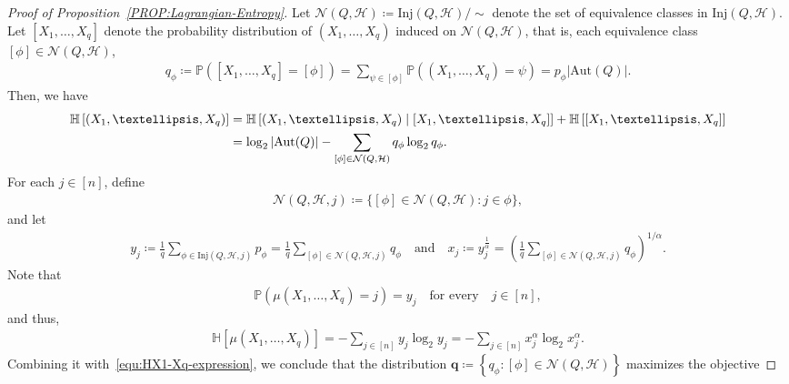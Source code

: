 \documentclass[10pt,a4paper]{amsart}
\begin{document}
\begin{proof}[Proof of Proposition~\ref{PROP:Lagrangian-Entropy}]
    Let $\mathcal{N}(Q,\mathcal{H}) \coloneqq \mathrm{Inj}(Q,\mathcal{H})/\sim$ denote the set of equivalence classes in $\mathrm{Inj}(Q,\mathcal{H})$. 
    Let $[X_1, \ldots, X_q]$ denote the probability distribution of $(X_1, \ldots, X_q)$ induced on $\mathcal{N}(Q,\mathcal{H})$, that is, each equivalence class $[\phi] \in \mathcal{N}(Q,\mathcal{H})$, 
    \begin{align}\label{equ:def-q-phi}
        q_{\phi}
        \coloneqq \mathbb{P}\left([X_1, \ldots, X_q] = [\phi] \right)
        = \sum_{\psi \in [\phi]} \mathbb{P}\left((X_1, \ldots, X_q) = \psi\right) 
        = p_{\phi} |\mathrm{Aut}(Q)|. 
    \end{align}
    Then, we have  
    \begin{align}\label{equ:HX1-Xq-expression}
        \mathbb{H}\left[ (X_1, \ldots, X_q) \right]
        & = \mathbb{H}\left[ (X_1, \ldots, X_q) \mid [X_1, \ldots, X_q] \right] + \mathbb{H}\left[ [X_1, \ldots, X_q] \right] \notag \\
        & = \log_{2} |\mathrm{Aut}(Q)| - \sum_{[\phi] \in \mathcal{N}(Q,\mathcal{H})} q_{\phi} \log_{2} q_{\phi}. 
    \end{align}
    For each $j \in [n]$, define  
    \begin{align*}
        \mathcal{N}(Q, \mathcal{H}, j)
        \coloneqq \big\{  [\phi] \in \mathcal{N}(Q, \mathcal{H}) \colon j \in \phi \big\}, 
    \end{align*}
    and let 
    \begin{align}\label{equ:def-yj}
        y_j 
        \coloneqq \frac{1}{q} \sum_{\phi \in \mathrm{Inj}(Q,\mathcal{H}, j)}p_{\phi}
        = \frac{1}{q} \sum_{[\phi] \in \mathcal{N}(Q, \mathcal{H}, j)} q_{\phi}
        \quad\text{and}\quad 
        x_{j}
        \coloneqq  y_j^{\frac{1}{\alpha}}
        = \left(\frac{1}{q} \sum_{[\phi] \in \mathcal{N}(Q, \mathcal{H}, j)} q_{\phi}\right)^{1/\alpha}.  
    \end{align}
    Note that 
    \begin{align*}
        \mathbb{P}\left( \mu(X_1, \ldots, X_q) = j \right)
        = y_j
        \quad\text{for every}\quad j \in [n],  
    \end{align*}
    and thus, 
    \begin{align*}
        \mathbb{H}\left[\mu(X_1, \ldots, X_q)\right]
        = - \sum_{j\in [n]} y_j \log_{2} y_j 
        = - \sum_{j \in [n]} x_j^{\alpha} \log_{2} x_j^{\alpha}. 
    \end{align*}
    Combining it with~\eqref{equ:HX1-Xq-expression}, we conclude that the distribution $\mathbf{q} \coloneqq \left\{ q_{\phi} \colon [\phi] \in \mathcal{N}(Q, \mathcal{H}) \right\}$ maximizes the objective 

\end{proof}
\end{document}
